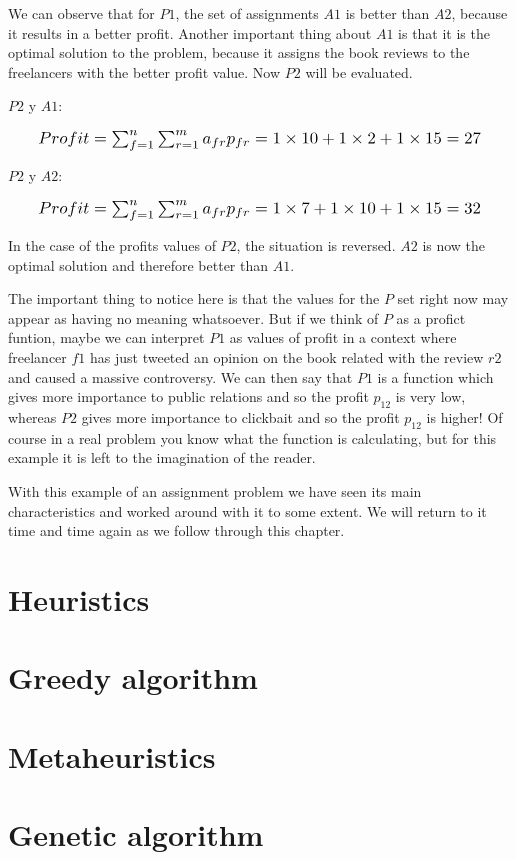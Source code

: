 We can observe that for $P1$, the set of assignments $A1$ is better than $A2$, because it results in a better profit. Another important thing about $A1$ is that it is the optimal solution to the problem, because it assigns the book reviews to the freelancers with the better profit value. Now $P2$ will be evaluated.

$P2$ y $A1$:

\begin{equation}
    \scalebox{1.2}{$Profit = \sum_{f=1}^n \sum_{r=1}^m a_{fr} p_{fr} = 1 \times 10 + 1 \times 2 + 1 \times 15 = 27$}
\end{equation}

$P2$ y $A2$:

\begin{equation}
    \scalebox{1.2}{$Profit = \sum_{f=1}^n \sum_{r=1}^m a_{fr} p_{fr} = 1 \times 7 + 1 \times 10 + 1 \times 15 = 32$}
\end{equation}

In the case of the profits values of $P2$, the situation is reversed. $A2$ is now the optimal solution and therefore better than $A1$.

The important thing to notice here is that the values for the $P$ set right now may appear as having no meaning whatsoever. But if we think of $P$ as a profict funtion, maybe we can interpret $P1$ as values of profit in a context where freelancer $f1$ has just tweeted an opinion on the book related with the review $r2$ and caused a massive controversy. We can then say that $P1$ is a function which gives more importance to public relations and so the profit $p_{12}$ is very low, whereas $P2$ gives more importance to clickbait and so the profit $p_{12}$ is higher! Of course in a real problem you know what the function is calculating, but for this example it is left to the imagination of the reader.

With this example of an assignment problem we have seen its main characteristics and worked around with it to some extent. We will return to it time and time again as we follow through this chapter. 


\section{Heuristics}


\section{Greedy algorithm}


\section{Metaheuristics}


\section{Genetic algorithm}

